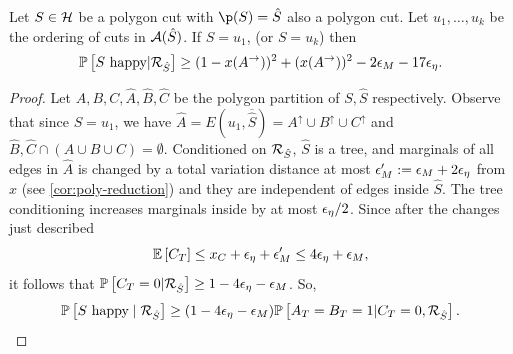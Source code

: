 

\begin{lemma} \label{lem:uhappy} 
Let $S\in\mathcal{H}$ be a polygon cut with $\p(S)=\hat{S}$ also a polygon cut.  Let $u_1,\dots,u_k$ be the ordering of cuts in ${\cal A}(\hat{S})$. If $S=u_1$, (or $S=u_k$) then
 $$ \P{S \text{ happy}| \cR_{\hat{S}}}%
 \ge  (1- x(A^\rightarrow))^2 + (x(A^\rightarrow))^2 -2\eps_M 
	- 17\eps_\eta.$$	
\end{lemma}
\begin{proof}
Let $A,B,C, \hat{A},\hat{B},\hat{C}$ be the polygon partition of $S, \hat{S}$ respectively. Observe that since $S=u_1$, we have $\hat{A}= E(u_1,\overline{\hat{S}})=A^\uparrow\cup B^\uparrow\cup C^\uparrow$ and $\hat{B},\hat{C} \cap (A\cup B\cup C)=\emptyset$. 
Conditioned on ${\mathcal{R}}_{\hat{S}}$, $\hat{S}$ is a tree,  and marginals of all edges in $\hat{A}$ is changed by a total variation distance at most ${\epsilon}'_M:={\epsilon}_M+2{\epsilon}_\eta$ from $x$ (see \cref{cor:poly-reduction}) and they are independent of edges inside $\hat S$. The tree conditioning increases marginals inside by at most ${\epsilon}_\eta/2$.  Since after the changes just described
$${\mathbb{E}}\left[C_T\right] \le x_C+ {\epsilon}_\eta + {\epsilon}'_M \le 4{\epsilon}_\eta +{\epsilon}_M,$$
it follows that ${\mathbb{P}}\left[C_T=0 | {\mathcal{R}}_{\hat{S}}\right]\geq 1- 4{\epsilon}_\eta -{\epsilon}_M$.
So, 
\begin{equation}\label{eq:prob-110-before-nu}{\mathbb{P}}\left[S\text{ happy} \mid {\mathcal{R}}_{\hat S}\right] \geq (1-4{\epsilon}_\eta - {\epsilon}_M){\mathbb{P}}\left[A_T=B_T=1 | C_T=0, {\mathcal{R}}_{\hat S}\right].	
\end{equation}


\end{proof}
